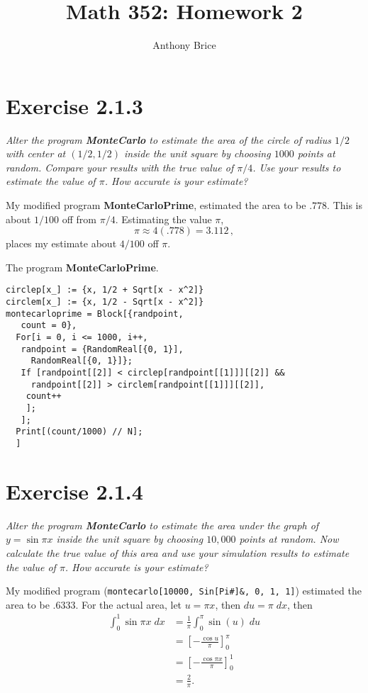 \documentclass{tufte-handout}
\title{Math 352: Homework 2}
\author{Anthony Brice}
\newenvironment{listingenv} {
  \begin{mylisting}
} {
  \end{mylisting}
}
\begin{document}
\maketitle

\section{Exercise 2.1.3}

\textit{Alter the program \textbf{MonteCarlo} to estimate the area of
  the circle of radius $1/2$ with center at $(1/2,1/2)$ inside the
  unit square by choosing $1000$ points at random. Compare your
  results with the true value of $\pi/4$. Use your results to estimate
  the value of $\pi$. How accurate is your estimate?}

\bigskip

My modified program \textbf{MonteCarloPrime}, estimated the area to
be $.778$. This is about $1/100$ off from $\pi/4$. Estimating the
value $\pi$, \[\pi \approx 4(.778) = 3.112 \,,\]
places my estimate about $4/100$ off $\pi$.

\begin{listingenv}
\caption{The program \mbox{\textbf{MonteCarloPrime}}.}
\begin{lstlisting}
circlep[x_] := {x, 1/2 + Sqrt[x - x^2]}
circlem[x_] := {x, 1/2 - Sqrt[x - x^2]}
montecarloprime = Block[{randpoint,
   count = 0},
  For[i = 0, i <= 1000, i++,
   randpoint = {RandomReal[{0, 1}],
     RandomReal[{0, 1}]};
   If [randpoint[[2]] < circlep[randpoint[[1]]][[2]] &&
     randpoint[[2]] > circlem[randpoint[[1]]][[2]],
    count++
    ];
   ];
  Print[(count/1000) // N];
  ]
\end{lstlisting}
\end{listingenv}

\section{Exercise 2.1.4}

\textit{Alter the program \textbf{MonteCarlo} to estimate the area
  under the graph of $y = \sin{\pi x}$ inside the unit square by
  choosing $10,000$ points at random. Now calculate the true value of
  this area and use your simulation results to estimate the value of
  $\pi$. How accurate is your estimate?}

\bigskip

My modified program (\lstinline$montecarlo[10000, Sin[Pi#]&, 0, 1, 1]$)
estimated the area to be $.6333$. For the actual area, let $u = \pi
x$, then $du = \pi \; dx$, then
\begin{align*}
  \int_0^1 \sin \pi x \; dx & = \frac{1}{\pi} \int_0^\pi
                              \sin(u) \; du \\
                            &= \left[ - \frac{\cos u}{\pi} \right]_0^\pi \\
                            &= \left[ - \frac{\cos \pi x}{\pi} \right]_0^1 \\
                            &= \frac{2}{\pi}.
\end{align*}
\end{document}
